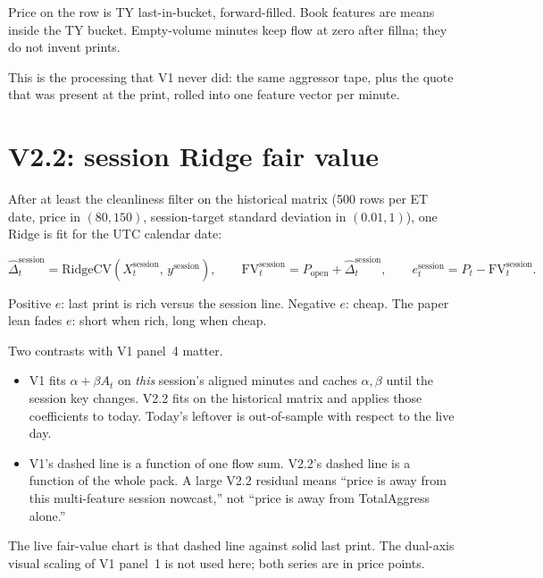 \documentclass[11pt]{article}
\begin{document}
Price on the row is TY last-in-bucket, forward-filled.  Book
features are means inside the TY bucket.  Empty-volume minutes keep
flow at zero after fillna; they do not invent prints.

This is the processing that V1 never did: the same aggressor tape,
plus the quote that was present at the print, rolled into one
feature vector per minute.


\section{V2.2: session Ridge fair value}

After at least the cleanliness filter on the historical matrix
(500 rows per ET date, price in \((80,150)\), session-target
standard deviation in \((0.01,1)\)), one Ridge is fit for the UTC
calendar date:

\begin{equation}
  \widehat{\Delta}^{\mathrm{session}}_t
  =
  \mathrm{RidgeCV}(X^{\mathrm{session}}_t,\, y^{\mathrm{session}}),
  \qquad
  \mathrm{FV}^{\mathrm{session}}_t
  =
  P_{\mathrm{open}} + \widehat{\Delta}^{\mathrm{session}}_t,
  \qquad
  e^{\mathrm{session}}_t
  =
  P_t - \mathrm{FV}^{\mathrm{session}}_t.
\end{equation}

Positive \(e\): last print is rich versus the session line.
Negative \(e\): cheap.  The paper lean fades \(e\): short when
rich, long when cheap.

Two contrasts with V1 panel~4 matter.

\begin{itemize}
    \item V1 fits \(\alpha+\beta A_t\) on \emph{this} session's
    aligned minutes and caches \(\alpha,\beta\) until the session
    key changes.  V2.2 fits on the historical matrix and applies
    those coefficients to today.  Today's leftover is
    out-of-sample with respect to the live day.
    \item V1's dashed line is a function of one flow sum.  V2.2's
    dashed line is a function of the whole pack.  A large V2.2
    residual means ``price is away from this multi-feature session
    nowcast,'' not ``price is away from TotalAggress alone.''
\end{itemize}

The live fair-value chart is that dashed line against solid last
print.  The dual-axis visual scaling of V1 panel~1 is not used
here; both series are in price points.
\end{document}
